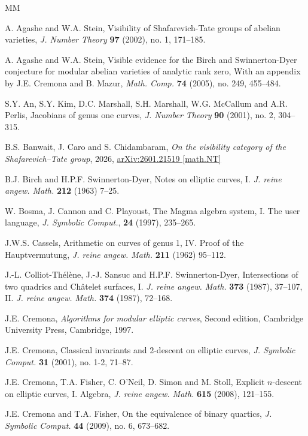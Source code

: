 \documentclass[12pt]{amsart}
\theoremstyle{definition}
\begin{document}
\begin{thebibliography}{MM}
\frenchspacing
\renewcommand{\baselinestretch}{1}

A. Agashe and W.A. Stein,
Visibility of Shafarevich-Tate groups of abelian varieties,
{\em J. Number Theory} {\bf 97} (2002), no. 1, 171--185.

A. Agashe and W.A. Stein,  
Visible evidence for the Birch and Swinnerton-Dyer conjecture
for modular abelian varieties of analytic rank zero,
With an appendix by J.E. Cremona and B. Mazur,
{\em Math. Comp.} {\bf 74} (2005), no. 249, 455--484.

S.Y. An, S.Y. Kim, D.C. Marshall, S.H. Marshall, W.G. McCallum
and A.R. Perlis,
Jacobians of genus one curves,
{\em J. Number Theory} {\bf 90} (2001), no. 2, 304--315.

B.S. Banwait, J. Caro and S. Chidambaram,
{\em On the visibility category of the Shafarevich--Tate group},
2026, \url{arXiv:2601.21519 [math.NT]}

B.J. Birch and H.P.F. Swinnerton-Dyer, 
Notes on elliptic curves, I.
{\em J. reine angew. Math.} {\bf{212}} (1963) 7--25.

W. Bosma, J. Cannon and C. Playoust,
The Magma algebra system, I. The user language,
{\em J. Symbolic Comput.}, {\bf{24}} (1997), 235--265. 

J.W.S. Cassels, 
Arithmetic on curves of genus 1, 
IV. Proof of the Hauptvermutung,
{\em J. reine angew. Math.} {\bf{211}} (1962) 95--112.

J.-L. Colliot-Th\'el\`ene, J.-J. Sansuc and H.P.F. Swinnerton-Dyer,
Intersections of two quadrics and Châtelet surfaces, I.
{\em J. reine angew. Math.} {\bf 373} (1987), 37--107,
II. {\em J. reine angew. Math.} {\bf{374}} (1987), 72--168. 

J.E. Cremona, 
{\em Algorithms for modular elliptic curves},
Second edition, Cambridge University Press, Cambridge, 1997. 

J.E. Cremona, 
Classical invariants and 2-descent on elliptic curves,
{\em J. Symbolic Comput.} {\bf{31}} (2001), no. 1-2, 71--87.

J.E. Cremona, T.A. Fisher, C. O'Neil, D. Simon and M. Stoll,  
Explicit $n$-descent on elliptic curves, I. Algebra,
{\em J. reine angew. Math.} {\bf{615}} (2008), 121--155.

J.E. Cremona and T.A. Fisher, 
On the equivalence of binary quartics,
{\em J. Symbolic Comput.} {\bf{44}} (2009), no. 6, 673--682.


\end{thebibliography}
\end{document}
